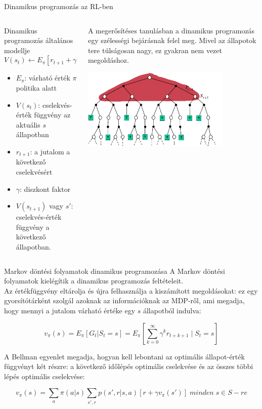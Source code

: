 \documentclass[english, aspectratio=169]{beamer}
\begin{document}
\begin{frame}{Dinamikus programozás az RL-ben}
\begin{columns}
\begin{column}{.5\textwidth}
\begin{block}{Dinamikus programozás általános modellje}
\[
V(s_{t})\leftarrow E_{\pi}\left[r_{t+1} + \gamma V(s_{t+1})\right]
\]
\begin{itemize}
	\item $E_{\pi}$: várható érték $\pi$ politika alatt
	\item $V(s_{t})$: cselekvés-érték függvény az aktuális $s$ állapotban
	\item $r_{t+1}$: a jutalom a következő cselekvésért
	\item $\gamma$: diszkont faktor
	\item $V(s_{t+1})$ vagy $s'$: cselekvés-érték függvény a következő állapotban.
\end{itemize}
\end{block}
\end{column}
\begin{column}{.5\textwidth}
A megerősítéses tanulásban a dinamikus programozás egy szélességi bejárásnak felel meg. Mivel az állapotok tere túlságosan nagy, ez gyakran nem vezet megoldáshoz. 
\begin{center}
\includegraphics[width=7cm, keepaspectratio]{images/solving_10}
\end{center}
\end{column}
\end{columns}
\end{frame}

\begin{frame}{Markov döntési folyamatok dinamikus programozása}
A Markov döntési folyamatok kielégítik a dinamikus programozás feltételeit.\\
Az értékfüggvény eltárolja és újra felhasználja a kiszámított megoldásokat: ez egy gyorsítótárként szolgál azoknak az információknak az MDP-ről, ami megadja, hogy mennyi a jutalom várható értéke egy $s$ állapotból indulva:
\begin{block}{}
\[
v_{\pi}(s)=E_{\pi}\left[G_{t}|S_{t}=s\right]=E_{\pi}\left[\sum_{k=0}^{\infty}\gamma^{k}r_{t+k+1}\mid S_{t}=s\right]
\]
\end{block}
A Bellman egyenlet megadja, hogyan kell lebontani az optimális állapot-érték függvényt két részre: a következő időlépés optimális cselekvése és az összes többi lépés optimális cselekvése:\\
\begin{block}{}
\[
v_{\pi}(s)=\sum_{a}\pi(a|s)\sum_{s',r}p\left(s',r|s,a\right)\left[r+\gamma v_{\pi}\left(s'\right)\right]\;minden\;s\in S-re
\]
\end{block}
\end{frame}
\end{document}

